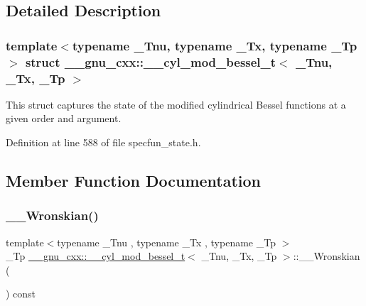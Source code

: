 \subsection{Detailed Description}
\subsubsection*{template$<$typename \+\_\+\+Tnu, typename \+\_\+\+Tx, typename \+\_\+\+Tp$>$\newline
struct \+\_\+\+\_\+gnu\+\_\+cxx\+::\+\_\+\+\_\+cyl\+\_\+mod\+\_\+bessel\+\_\+t$<$ \+\_\+\+Tnu, \+\_\+\+Tx, \+\_\+\+Tp $>$}

This struct captures the state of the modified cylindrical Bessel functions at a given order and argument. 

Definition at line 588 of file specfun\+\_\+state.\+h.



\subsection{Member Function Documentation}
\mbox{\label{struct____gnu__cxx_1_1____cyl__mod__bessel__t_a4e9bbc7f2cac91b245fda66b113fd5ac}} 
\subsubsection{\texorpdfstring{\+\_\+\+\_\+\+Wronskian()}{\_\_Wronskian()}}
{\footnotesize\ttfamily template$<$typename \+\_\+\+Tnu , typename \+\_\+\+Tx , typename \+\_\+\+Tp $>$ \\
\+\_\+\+Tp \hyperlink{struct____gnu__cxx_1_1____cyl__mod__bessel__t}{\+\_\+\+\_\+gnu\+\_\+cxx\+::\+\_\+\+\_\+cyl\+\_\+mod\+\_\+bessel\+\_\+t}$<$ \+\_\+\+Tnu, \+\_\+\+Tx, \+\_\+\+Tp $>$\+::\+\_\+\+\_\+\+Wronskian (\begin{DoxyParamCaption}{ }\end{DoxyParamCaption}) const\hspace{0.3cm}{\ttfamily [inline]}}



